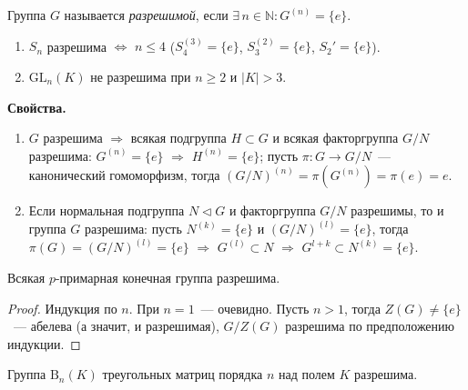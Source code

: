 \documentclass[a4paper]{article}
\newcommand{\svoy}{\vspace{5pt}\noindent\textbf{Свойства.}\vspace{-6pt}}
\begin{document}
Группа $G$ называется \emph{разрешимой}, если $\exists \,
n\in\mathbb{N}: G^{(n)}=\{e\}$.

\begin{ex}
\begin{enumerate}
  \item $S_n$ разрешима $\Leftrightarrow$ $n\leqslant 4$ ($S_4^{(3)}
  =\{e\}$, $S_3^{(2)}=\{e\}$, $S_2'=\{e\}$).
  \item $\mathrm{GL}_n(K)$ не разрешима при $n\geqslant 2$ и $|K|>3$.
\end{enumerate}
\end{ex}

\svoy
\begin{enumerate}
  \item $G$ разрешима $\Rightarrow$ всякая подгруппа $H\subset G$ и
  всякая факторгруппа $G/N$ разрешима: $G^{(n)}=\{e\}$ $\Rightarrow$
  $H^{(n)}=\{e\}$; пусть $\pi\colon G\to G/N$~--- канонический
  гомоморфизм, тогда $(G/N)^{(n)}=\pi(G^{(n)})=\pi(e)=e$.
  \item Если нормальная подгруппа $N\triangleleft G$ и факторгруппа
  $G/N$ разрешимы, то и группа $G$ разрешима: пусть $N^{(k)}=\{e\}$
  и $(G/N)^{(l)}=\{e\}$, тогда $\pi(G)=(G/N)^{(l)}=\{e\}$
  $\Rightarrow$ $G^{(l)}\subset N$ $\Rightarrow$ $G^{l+k}\subset
  N^{(k)}=\{e\}$.
\end{enumerate}

\begin{theorem}
Всякая $p$-примарная конечная группа разрешима.
\end{theorem}

\begin{proof}
Индукция по $n$. При $n=1$~--- очевидно. Пусть $n>1$, тогда
$Z(G)\neq \{e\}$~--- абелева (а значит, и разрешимая), $G/Z(G)$
разрешима по предположению индукции.
\end{proof}

\begin{theorem}
Группа $\mathrm{B}_n(K)$ треугольных матриц порядка $n$ над полем
$K$ разрешима.
\end{theorem}
\end{document}

